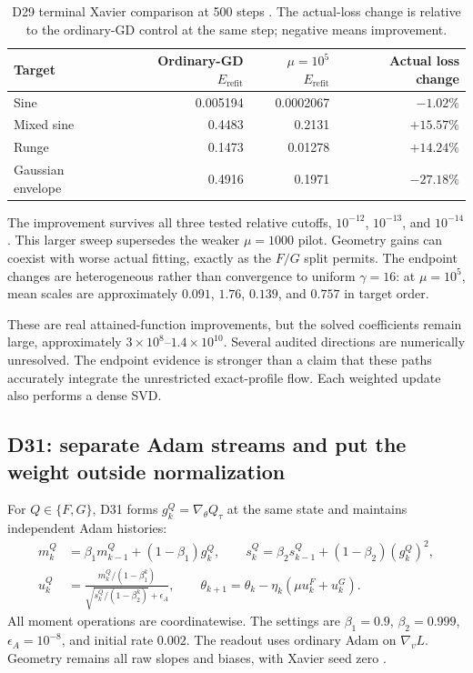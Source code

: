 \documentclass[11pt]{article}
\newcommand{\Eref}{E_{\mathrm{refit}}}
\begin{document}
\begin{table}[htbp]
\centering
\small
\begin{tabular}{@{}lrrr@{}}
\toprule
Target & Ordinary-GD $\Eref$ & $\mu=10^5$ $\Eref$ & Actual loss change\\
\midrule
Sine & 0.005194 & 0.0002067 & $-1.02\%$\\
Mixed sine & 0.4483 & 0.2131 & $+15.57\%$\\
Runge & 0.1473 & 0.01278 & $+14.24\%$\\
Gaussian envelope & 0.4916 & 0.1971 & $-27.18\%$\\
\bottomrule
\end{tabular}
\caption{D29 terminal Xavier comparison at 500 steps \cite{D29}. The actual-loss change is relative to the ordinary-GD control at the same step; negative means improvement.}
\label{tab:D29}
\end{table}

The improvement survives all three tested relative cutoffs, $10^{-12}$, $10^{-13}$, and $10^{-14}$. This larger sweep supersedes the weaker $\mu=1000$ pilot. Geometry gains can coexist with worse actual fitting, exactly as the $F/G$ split permits. The endpoint changes are heterogeneous rather than convergence to uniform $\gamma=16$: at $\mu=10^5$, mean scales are approximately $0.091$, $1.76$, $0.139$, and $0.757$ in target order.

These are real attained-function improvements, but the solved coefficients remain large, approximately $3\times10^8$--$1.4\times10^{10}$. Several audited directions are numerically unresolved. The endpoint evidence is stronger than a claim that these paths accurately integrate the unrestricted exact-profile flow. Each weighted update also performs a dense SVD.

\subsection{D31: separate Adam streams and put the weight outside normalization}

For $Q\in\{F,G\}$, D31 forms $g_k^Q=\nabla_\theta Q_\tau$ at the same state and maintains independent Adam histories:
\begin{align}
 m_k^Q&=\beta_1m_{k-1}^Q+(1-\beta_1)g_k^Q,\qquad
 s_k^Q=\beta_2s_{k-1}^Q+(1-\beta_2)(g_k^Q)^2,\\
 u_k^Q&=\frac{m_k^Q/(1-\beta_1^k)}
 {\sqrt{s_k^Q/(1-\beta_2^k)}+\epsilon_A},\qquad
 \boxed{\theta_{k+1}=\theta_k-\eta_k(\mu u_k^F+u_k^G).}
 \label{eq:split-adam}
\end{align}
All moment operations are coordinatewise. The settings are $\beta_1=0.9$, $\beta_2=0.999$, $\epsilon_A=10^{-8}$, and initial rate $0.002$. The readout uses ordinary Adam on $\nabla_vL$. Geometry remains all raw slopes and biases, with Xavier seed zero \cite{D31}.
\end{document}
